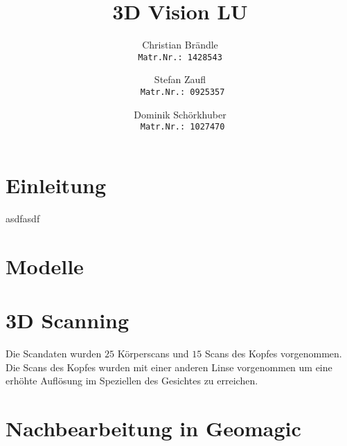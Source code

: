 \documentclass[]{article}
\title{3D Vision LU}
\author{Christian Br\"andle \\
\texttt{Matr.Nr.: 1428543}
\and Stefan Zaufl \\
\texttt{ Matr.Nr.: 0925357}
\and Dominik Sch\"orkhuber\\
\texttt{ Matr.Nr.: 1027470}}
\begin{document}
\maketitle


\section{Einleitung}
asdfasdf

\section{Modelle}
\subsection{}
\subsection{}
\subsection{}

\section{3D Scanning}

Die Scandaten wurden $25$ Körperscans und $15$ Scans des Kopfes vorgenommen.
Die Scans des Kopfes wurden mit einer anderen Linse vorgenommen um eine erhöhte Auflösung im Speziellen des Gesichtes zu erreichen.

\subsection{}
\subsection{}
\subsection{}

\section{Nachbearbeitung in Geomagic}
\end{document}
